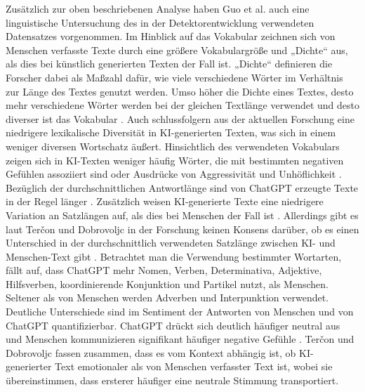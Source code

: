 Zusätzlich zur oben beschriebenen Analyse haben Guo et al. \autocite{guo2023closechatgpthumanexperts} auch eine linguistische Untersuchung des in der Detektorentwicklung verwendeten Datensatzes vorgenommen. Im Hinblick auf das Vokabular zeichnen sich von Menschen verfasste Texte durch eine größere Vokabulargröße und „Dichte“ aus, als dies bei künstlich generierten Texten der Fall ist. „Dichte“ definieren die Forscher dabei als Maßzahl dafür, wie viele verschiedene Wörter im Verhältnis zur Länge des Textes genutzt werden. Umso höher die Dichte eines Textes, desto mehr verschiedene Wörter werden bei der gleichen Textlänge verwendet und desto diverser ist das Vokabular \autocite{guo2023closechatgpthumanexperts}. Auch \autocite{tercon2025linguisticcharacteristicsaigeneratedtext} schlussfolgern aus der aktuellen Forschung eine niedrigere lexikalische Diversität in KI-generierten Texten, was sich in einem weniger diversen Wortschatz äußert. Hinsichtlich des verwendeten Vokabulars zeigen sich in KI-Texten weniger häufig Wörter, die mit bestimmten negativen Gefühlen assoziiert sind oder Ausdrücke von Aggressivität und Unhöflichkeit \autocite{tercon2025linguisticcharacteristicsaigeneratedtext}. Bezüglich der durchschnittlichen Antwortlänge sind von ChatGPT erzeugte Texte in der Regel länger \autocite{guo2023closechatgpthumanexperts}. Zusätzlich weisen KI-generierte Texte eine niedrigere Variation an Satzlängen auf, als dies bei Menschen der Fall ist \autocite{tercon2025linguisticcharacteristicsaigeneratedtext}. Allerdings gibt es laut Ter\v{c}on und Dobrovoljc in der Forschung keinen Konsens darüber, ob es einen Unterschied in der durchschnittlich verwendeten Satzlänge zwischen KI- und Menschen-Text gibt \autocite{tercon2025linguisticcharacteristicsaigeneratedtext}. Betrachtet man die Verwendung bestimmter Wortarten, fällt auf, dass ChatGPT mehr Nomen, Verben, Determinativa, Adjektive, Hilfsverben, koordinierende Konjunktion und Partikel nutzt, als Menschen. Seltener als von Menschen werden Adverben und Interpunktion verwendet. Deutliche Unterschiede sind im Sentiment der Antworten von Menschen und von ChatGPT quantifizierbar. ChatGPT drückt sich deutlich häufiger neutral aus und Menschen kommunizieren signifikant häufiger negative Gefühle \autocite{guo2023closechatgpthumanexperts}. Ter\v{c}on und Dobrovoljc fassen zusammen, dass es vom Kontext abhängig ist, ob KI-generierter Text emotionaler als von Menschen verfasster Text ist, wobei sie übereinstimmen, dass ersterer häufiger eine neutrale Stimmung transportiert.

